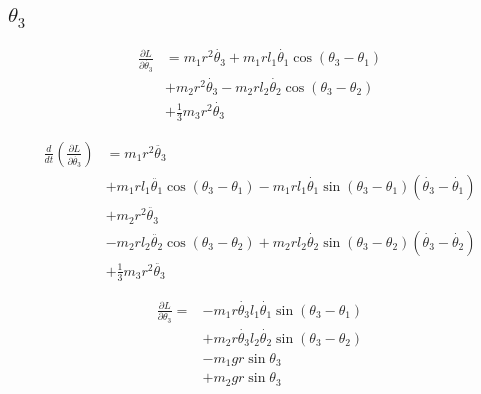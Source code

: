 \documentclass[titlepage]{article}
\numberwithin{equation}{section}
\begin{document}
\subsection{$\theta_3$}
\begin{align}
\frac{\partial L}{\partial \dot{\theta_3}} &= m_1 r^2 \dot{\theta_3} + m_1 r l_1 \dot{\theta_1} \cos{(\theta_3 - \theta_1)} \nonumber \\
 &+ m_2 r^2 \dot{\theta_3} - m_2 r l_2 \dot{\theta_2} \cos{(\theta_3 - \theta_2)} \nonumber \\
 &+ \frac{1}{3} m_3 r^2 \dot{\theta_3}
\end{align}

\begin{align}
\frac{d}{dt} \left(\frac{\partial L}{\partial \dot{\theta_3}}\right) &= m_1 r^2 \ddot{\theta_3} \nonumber \\
 &+ m_1 r l_1 \ddot{\theta_1} \cos{(\theta_3 - \theta_1)} - m_1 r l_1 \dot{\theta_1} \sin{(\theta_3 - \theta_1)} (\dot{\theta_3} - \dot{\theta_1}) \nonumber \\
 &+ m_2 r^2 \ddot{\theta_3} \nonumber \\
 &- m_2 r l_2 \ddot{\theta_2} \cos{(\theta_3 - \theta_2)} + m_2 r l_2 \dot{\theta_2} \sin{(\theta_3 - \theta_2)} (\dot{\theta_3} - \dot{\theta_2}) \nonumber \\
 &+ \frac{1}{3} m_3 r^2 \ddot{\theta_3} \label{eq:LE_left_t3}
\end{align}

\begin{align}
\frac{\partial L}{\partial \theta_3} = &- m_1 r \dot{\theta_3} l_1 \dot{\theta_1} \sin{(\theta_3 - \theta_1)} \nonumber \\
 &+ m_2 r \dot{\theta_3} l_2 \dot{\theta_2} \sin{(\theta_3 - \theta_2)} \nonumber \\
 &- m_1 g r \sin \theta_3 \nonumber \\
 &+ m_2 g r \sin \theta_3
\label{eq:LE_right_t3}
\end{align}
\end{document}
